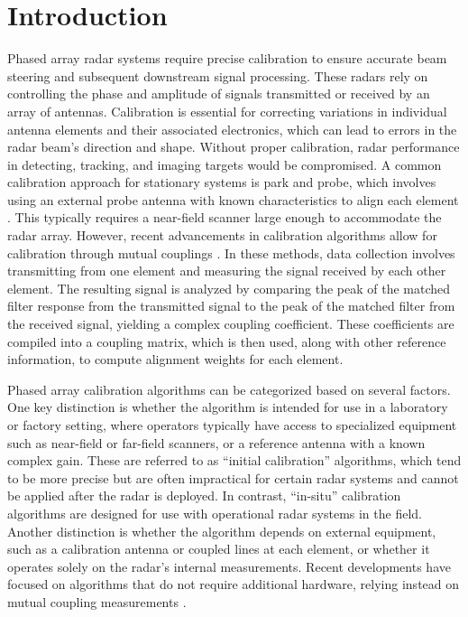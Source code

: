 \documentclass[journal]{IEEEtran}
\begin{document}
\section{Introduction}
Phased array radar systems require precise calibration to ensure accurate beam steering and subsequent downstream signal processing. These radars rely on controlling the phase and amplitude of signals transmitted or received by an array of antennas. Calibration is essential for correcting variations in individual antenna elements and their associated electronics, which can lead to errors in the radar beam’s direction and shape. Without proper calibration, radar performance in detecting, tracking, and imaging targets would be compromised. A common calibration approach for stationary systems is park and probe, which involves using an external probe antenna with known characteristics to align each element \cite{simpleParkProbe,fastSimplePP,seker,brown2014phased}. This typically requires a near-field scanner large enough to accommodate the radar array. However, recent advancements in calibration algorithms allow for calibration through mutual couplings \cite{horuscal, dipole, largeScale,bekers,hassett,mitchell,fulton,aumann,dipole,embeddedFeedLineCal,javier,seker,lebron, herd2015}. In these methods, data collection involves transmitting from one element and measuring the signal received by each other element. The resulting signal is analyzed by comparing the peak of the matched filter response from the transmitted signal to the peak of the matched filter from the received signal, yielding a complex coupling coefficient. These coefficients are compiled into a coupling matrix, which is then used, along with other reference information, to compute alignment weights for each element.

Phased array calibration algorithms can be categorized based on several factors. One key distinction is whether the algorithm is intended for use in a laboratory or factory setting, where operators typically have access to specialized equipment such as near-field or far-field scanners, or a reference antenna with a known complex gain. These are referred to as ``initial calibration'' algorithms, which tend to be more precise but are often impractical for certain radar systems and cannot be applied after the radar is deployed. In contrast, ``in-situ'' calibration algorithms are designed for use with operational radar systems in the field. Another distinction is whether the algorithm depends on external equipment, such as a calibration antenna or coupled lines at each element, or whether it operates solely on the radar's internal measurements. Recent developments have focused on algorithms that do not require additional hardware, relying instead on mutual coupling measurements \cite{horuscal,dipole,largeScale,bekers,hassett,mitchell,fulton,aumann,dipole,javier,seker,lebron}.
\end{document}
